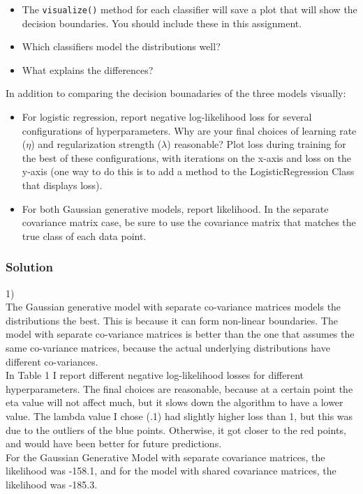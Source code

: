 \documentclass[submit]{harvardml}
\begin{document}
\begin{problem}
\begin{itemize}
\item The \texttt{visualize()} method for each classifier will save a plot that will show the decision boundaries. You should include these in this assignment.
\item Which classifiers model the distributions well?
\item What explains the differences?

\end{itemize}

In addition to comparing the decision bounadaries of the three models visually:
\begin{itemize}

\item For logistic regression, report negative log-likelihood loss for several configurations of hyperparameters. Why are your final choices of learning rate ($\eta$) and regularization strength ($\lambda$) reasonable? Plot loss during training for the best of these configurations, with iterations on the x-axis and loss on the y-axis (one way to do this is to add a method to the LogisticRegression Class that displays loss).

\item For both Gaussian generative models, report likelihood. In the separate covariance matrix case, be sure to use the covariance matrix that matches the true class of each data point.

\end{itemize}

\end{problem}

\subsubsection*{Solution}
1)\\
The Gaussian generative model with separate co-variance matrices models the distributions the best.  This is because it can form non-linear boundaries.  The model with separate co-variance matrices is better than the one that assumes the same co-variance matrices, because the actual underlying distributions have different co-variances.  \\
In Table 1 I report different negative log-likelihood losses for different hyperparameters.  The final choices are reasonable, because at a certain point the eta value will not affect much, but it slows down the algorithm to have a lower value.  The lambda value I chose (.1) had slightly higher loss than 1, but this was due to the outliers of the blue points.  Otherwise, it got closer to the red points, and would have been better for future predictions.\\
For the Gaussian Generative Model with separate covariance matrices, the likelihood was -158.1, and for the model with shared covariance matrices, the likelihood was -185.3.
\end{document}
